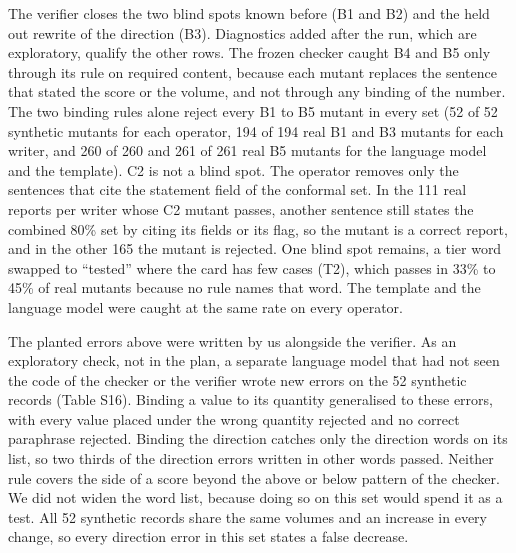 \documentclass[11pt,a4paper]{article}
\begin{document}
The verifier closes the two blind spots known before (B1 and B2) and the held out rewrite of the direction (B3).
Diagnostics added after the run, which are exploratory, qualify the other rows. The frozen checker caught B4 and B5
only through its rule on required content, because each mutant replaces the sentence that stated the score or the
volume, and not through any binding of the number. The two binding rules alone reject every B1 to B5 mutant in every
set (52 of 52 synthetic mutants for each operator, 194 of 194 real B1 and B3 mutants for each writer, and 260 of 260
and 261 of 261 real B5 mutants for the language model and the template). C2 is not a blind spot. The operator removes
only the sentences that cite the statement field of the conformal set. In the 111 real reports per writer whose C2
mutant passes, another sentence still states the combined 80\% set by citing its fields or its flag, so the mutant is
a correct report, and in the other 165 the mutant is rejected. One blind spot remains, a tier word swapped to
``tested'' where the card has few cases (T2), which passes in 33\% to 45\% of real mutants because no rule names that
word. The template and the language model were caught at the same rate on every operator.

The planted errors above were written by us alongside the verifier. As an exploratory check, not in the plan, a
separate language model that had not seen the code of the checker or the verifier wrote new errors on the 52 synthetic records
(Table S16). Binding a value to its quantity generalised to these errors, with every value placed under the wrong
quantity rejected and no correct paraphrase rejected. Binding the direction catches only the direction words on its
list, so two thirds of the direction errors written in other words passed. Neither rule covers the side of a score
beyond the above or below pattern of the checker. We did not widen the word list, because doing so on this set would
spend it as a test. All 52 synthetic records share the same volumes and an increase in every change, so every
direction error in this set states a false decrease.
\end{document}
